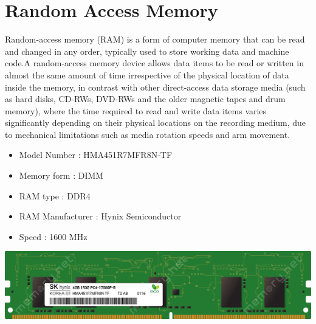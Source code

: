 \documentclass{article}
\begin{document}
\section{Random Access Memory}
Random-access memory (RAM) is a form of computer memory that can be read and changed in any order, typically used to store working data and machine code.A random-access memory device allows data items to be read or written in almost the same amount of time irrespective of the physical location of data inside the memory, in contrast with other direct-access data storage media (such as hard disks, CD-RWs, DVD-RWs and the older magnetic tapes and drum memory), where the time required to read and write data items varies significantly depending on their physical locations on the recording medium, due to mechanical limitations such as media rotation speeds and arm movement.
\begin{itemize}
  \item Model Number        : HMA451R7MFR8N-TF
  \item Memory form         : DIMM
  \item RAM type            : DDR4
  \item RAM Manufacturer        : Hynix Semiconductor 
  \item Speed               : 1600 MHz
\end{itemize}
\href{https://www.datasheets360.com/pdf/4058231500629532296}{\includegraphics[width=\textwidth]{RAM.png}}
\end{document}
